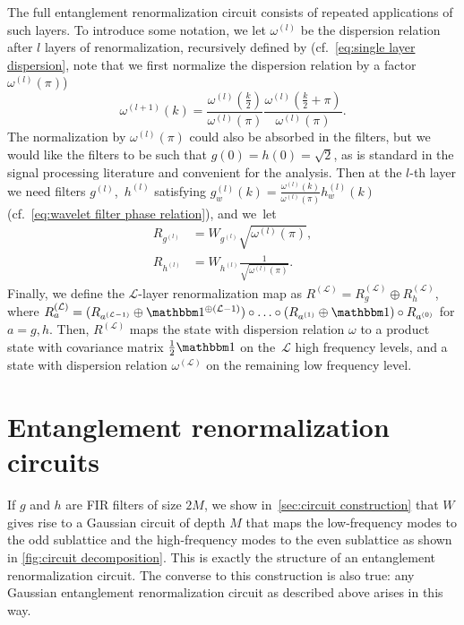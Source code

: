 \documentclass[submission, Phys]{SciPost}
\theoremstyle{definition}
\theoremstyle{remark}
\newcommand{\op}{\oplus}
\newcommand{\id}{\mathbbm 1}
\newcommand{\cL}{\mathcal L}
\begin{document}
The full entanglement renormalization circuit consists of repeated applications of such layers.
To introduce some notation, we let $\omega^{(l)}$ be the dispersion relation after $l$ layers of renormalization, recursively defined by (cf.~\cref{eq:single layer dispersion}, note that we first normalize the dispersion relation by a factor $\omega^{(l)}(\pi)$)
\begin{equation}\label{eq:renormalized disperson}
  \omega^{(l+1)}(k) = \frac{\omega^{(l)}(\frac{k}{2})}{\omega^{(l)}(\pi)} \frac{\omega^{(l)}(\frac{k}{2} + \pi)}{\omega^{(l)}(\pi)}.
\end{equation}
The normalization by $\omega^{(l)}(\pi)$ could also be absorbed in the filters, but we would like the filters to be such that $g(0) = h(0) = \sqrt2$, as is standard in the signal processing literature and convenient for the analysis.
Then at the $l$-th layer we need filters $g^{(l)}$,~$h^{(l)}$ satisfying $g^{(l)}_w(k) = \frac{\omega^{(l)}(k)}{\omega^{(l)}(\pi)}h^{(l)}_w(k)$ (cf.~\cref{eq:wavelet filter phase relation}), and we~let
\begin{equation}\begin{aligned}\label{eq:filter plus squeezing}
  R_{g^{(l)}} &= W_{g^{(l)}} \sqrt{\omega^{(l)}(\pi)}, \\
  R_{h^{(l)}} &= W_{h^{(l)}} \frac1{\sqrt{\omega^{(l)}(\pi)}}.
\end{aligned}\end{equation}
Finally, we define the $\cL$-layer renormalization map as $R^{(\cL)} = R_g^{(\cL)} \op R_h^{(\cL)}$, where
$R_a^{(\cL)} = (R_{a^{(\cL-1)}} \op \id^{\op(\cL - 1)}) \circ \ldots \circ (R_{a^{(1)}} \op \id) \circ R_{a^{(0)}}$
for $a = g,h$.
Then, $R^{(\cL)}$ maps the state with dispersion relation $\omega$ to a product state with covariance matrix $\frac12\id$ on the~$\cL$ high frequency levels, and a state with dispersion relation $\omega^{(\cL)}$ on the remaining low frequency level.


\section{Entanglement renormalization circuits}\label{sec:circuits}
If $g$ and $h$ are FIR filters of size $2M$, we show in~\cref{sec:circuit construction} that $W$ gives rise to a Gaussian circuit of depth $M$ that maps the low-frequency modes to the odd sublattice and the high-frequency modes to the even sublattice as shown in \cref{fig:circuit decomposition}.
This is exactly the structure of an entanglement renormalization circuit.
The converse to this construction is also true: any Gaussian entanglement renormalization circuit as described above arises in this way.
\end{document}
